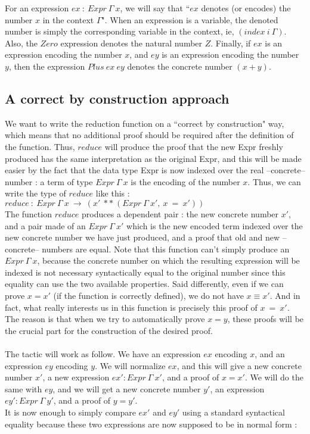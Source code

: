 For an expression $ex\ :\ Expr\ \Gamma\ x$, we will say that ``$ex$ denotes (or encodes) the number $x$ in the context $\Gamma$".
When an expression is a variable, the denoted number is simply the corresponding variable in the context, ie, $(index\ i\ \Gamma)$.
Also, the $Zero$ expression denotes the natural number $Z$.
Finally, if $ex$ is an expression encoding the number $x$, and $ey$ is an expression encoding the number $y$, then the expression $Plus\ ex\ ey$ denotes the concrete number $(x + y)$.


\subsection{A correct by construction approach}

We want to write the reduction function on a ``correct by construction" way, which means that no additional proof should be required after the definition of the function. Thus, $reduce$ will produce the proof that the new Expr freshly produced has the same interpretation as the original Expr, and this will be made easier by the fact that the data type Expr is now indexed over the real --concrete-- number : a term of type $Expr\ \Gamma\ x$ is the encoding of the number $x$.
Thus, we can write the type of $reduce$ like this : \\
$reduce\ :\ Expr\ \Gamma\ x\ \rightarrow\ (x'\ **\ (Expr\ \Gamma\ x',\ x\ =\ x'))$ \\
The function $reduce$ produces a dependent pair : the new concrete number $x'$, and a pair made of an $Expr\ \Gamma\ x'$ which is the new encoded term indexed over the new concrete number we have just produced, and a proof that old and new --concrete-- numbers are equal.
Note that this function can't simply produce an $Expr\ \Gamma\ x$, because the concrete number on which the resulting expression will be indexed is not necessary syntactically equal to the original number since this equality can use the two available properties. Said differently, even if we can prove $x=x'$ (if the function is correctly defined), we do not have $x \equiv x'$.
And in fact, what really interests us in this function is precisely this proof of $x\ =\ x'$.
The reason is that when we try to automatically prove $x=y$, these proofs will be the crucial part for the construction of the desired proof. \\
\\
The tactic will work as follow.
We have an expression $ex$ encoding $x$, and an expression $ey$ encoding $y$. We will normalize $ex$, and this will give a new concrete number $x'$, a new expression $ex':Expr\ \Gamma\ x'$, and a proof of $x=x'$. We will do the same with $ey$, and we will get a new concrete number $y'$, an expression $ey':Expr\ \Gamma\ y'$, and a proof of $y=y'$. \\
It is now enough to simply compare $ex'$ and $ey'$ using a standard syntactical equality because these two expressions are now supposed to be in normal form :

